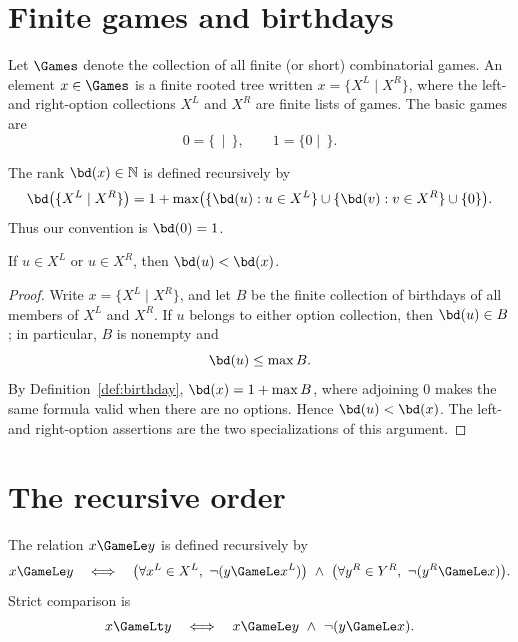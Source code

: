 \section{Finite games and birthdays}

\begin{definition}
  \label{def:game}
  \leanok
  Let \(\Games\) denote the collection of all finite (or short) combinatorial games.  An
  element \(x\in\Games\) is a finite rooted tree written \(x=\{X^L\mid X^R\}\), where the
  left- and right-option collections \(X^L\) and \(X^R\) are finite lists of games.  The basic
  games are
  \[
    0=\{\,\mid\,\},\qquad 1=\{0\mid\,\}.
  \]
\end{definition}

\begin{definition}
  \label{def:birthday}
  \leanok
  The rank \(\bd(x)\in\mathbb N\) is defined recursively by
  \[
    \bd\bigl(\{X^L\mid X^R\}\bigr)
      = 1+\max\bigl(\{\bd(u):u\in X^L\}\cup
                         \{\bd(v):v\in X^R\}\cup\{0\}\bigr).
  \]
  Thus our convention is \(\bd(0)=1\).
\end{definition}

\begin{lemma}
  \label{lem:birthday-options}
  \leanok
  If \(u\in X^L\) or \(u\in X^R\), then \(\bd(u)<\bd(x)\).
\end{lemma}
\begin{proof}
  \leanok
  Write \(x=\{X^L\mid X^R\}\), and let \(B\) be the finite collection of
  birthdays of all members of \(X^L\) and \(X^R\).  If \(u\) belongs to either
  option collection, then \(\bd(u)\in B\); in particular, \(B\) is nonempty
  and
  \[
    \bd(u)\leq \max B.
  \]
  By Definition~\ref{def:birthday}, \(\bd(x)=1+\max B\), where adjoining
  \(0\) makes the same formula valid when there are no options.  Hence
  \(\bd(u)<\bd(x)\).  The left- and right-option assertions are the two
  specializations of this argument.
\end{proof}

\section{The recursive order}

\begin{definition}
  \label{def:game-order}
  \leanok
  The relation \(x\GameLe y\) is defined recursively by
  \[
    x\GameLe y
    \quad\Longleftrightarrow\quad
    \bigl(\forall x^L\in X^L,\ \neg(y\GameLe x^L)\bigr)
    \ \wedge\
    \bigl(\forall y^R\in Y^R,\ \neg(y^R\GameLe x)\bigr).
  \]
  Strict comparison is
  \[
    x\GameLt y \quad\Longleftrightarrow\quad
    x\GameLe y\ \wedge\ \neg(y\GameLe x).
  \]
\end{definition}

